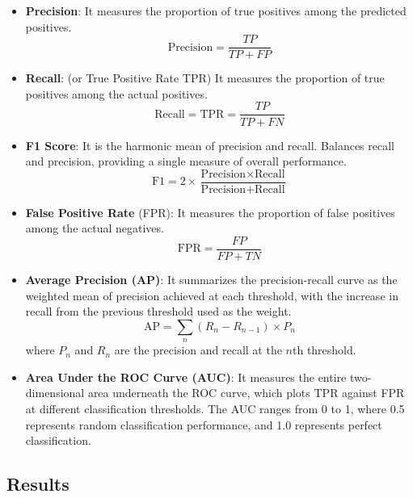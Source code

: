 \documentclass[pdflatex,sn-mathphys-num]{sn-jnl}%
\theoremstyle{thmstyleone}%
\theoremstyle{thmstyletwo}%
\theoremstyle{thmstylethree}%
\begin{document}
\begin{itemize}
    \item \textbf{Precision}: It measures the proportion of true positives among the predicted positives. \[\text{Precision} = \frac{TP}{TP + FP}\]
    \item \textbf{Recall}: (or True Positive Rate TPR) It measures the proportion of true positives among the actual positives. \[\text{Recall} = \text{TPR} = \frac{TP}{TP + FN}\]
    \item \textbf{F1 Score}: It is the harmonic mean of precision and recall. Balances recall and precision, providing a single measure of overall performance. \[\text{F1} = 2 \times \frac{\text{Precision} \times \text{Recall}}{\text{Precision} + \text{Recall}}\]
    \item \textbf{False Positive Rate} (FPR): It measures the proportion of false positives among the actual negatives. \[\text{FPR} = \frac{FP}{FP + TN}\]
    \item \textbf{Average Precision (AP)}: It summarizes the precision-recall curve as the weighted mean of precision achieved at each threshold, with the increase in recall from the previous threshold used as the weight.
    \[\text{AP} = \sum_{n} (R_n - R_{n-1}) \times P_n\]
    where $P_n$ and $R_n$ are the precision and recall at the $n$th threshold.
    \item \textbf{Area Under the ROC Curve (AUC)}: It measures the entire two-dimensional area underneath the ROC curve, which plots TPR against FPR at different classification thresholds.
    The AUC ranges from 0 to 1, where 0.5 represents random classification performance, and 1.0 represents perfect classification.
\end{itemize}

\subsection{Results}
\end{document}
